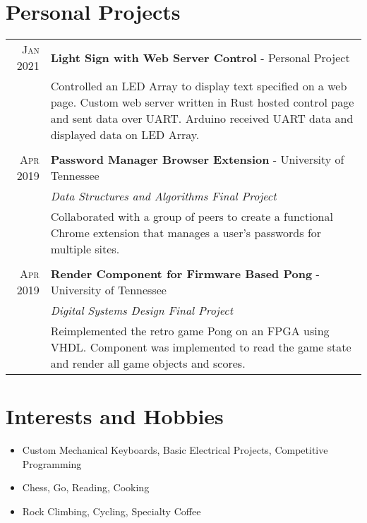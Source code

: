 \documentclass[a4paper,12pt]{article}
\begin{document}
\section{Personal Projects}

\begin{tabularx}{\textwidth}{r|X}

   \textsc{Jan 2021} & \textbf{Light Sign with Web Server Control} \-- Personal Project\\
   & \small{Controlled an LED Array to display text specified on a web page.
            Custom web server written in Rust hosted control page and sent data over UART.
            Arduino received UART data and displayed data on LED Array.
            }\\

   \multicolumn{2}{c}{} \\

   \textsc{Apr 2019} & \textbf{Password Manager Browser Extension} \-- University of Tennessee\\
   & \emph{Data Structures and Algorithms Final Project}\\
   & \small{Collaborated with a group of peers to create a functional Chrome extension that manages a user's passwords for multiple sites.}\\

   \multicolumn{2}{c}{} \\

   \textsc{Apr 2019} & \textbf{Render Component for Firmware Based Pong} \-- University of Tennessee\\
   & \emph{Digital Systems Design Final Project}\\
   & \small{Reimplemented the retro game Pong on an FPGA using VHDL\@.
            Component was implemented to read the game state and render all game objects and scores.
            }\\
\end{tabularx}


\section{Interests and Hobbies}
\begin{itemize}[topsep=2pt,itemsep=2pt,partopsep=2pt, parsep=2pt]
   \item Custom Mechanical Keyboards, Basic Electrical Projects, Competitive Programming
   \item Chess, Go, Reading, Cooking
   \item Rock Climbing, Cycling, Specialty Coffee
\end{itemize}
\end{document}
